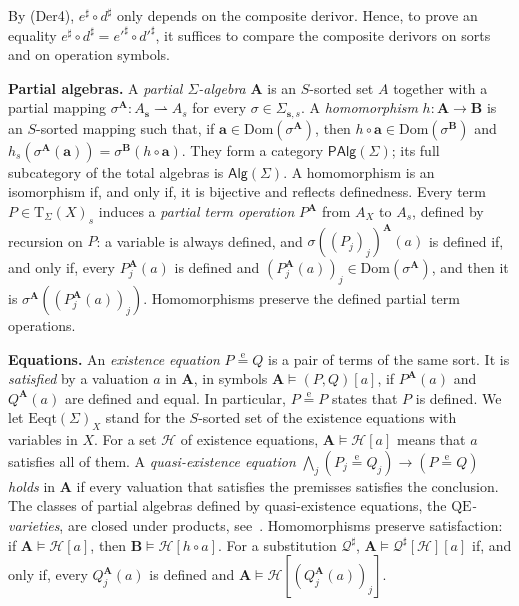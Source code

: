 \documentclass[a4paper,reqno]{amsart}
\newcommand{\eeq}{\overset{\mathrm e}{=}}        %
\newcommand{\QE}{\mathrm{QE}}
\newcommand{\Dom}{\mathrm{Dom}}
\newcommand{\Eeqt}{\mathrm{Eeqt}}
\newcommand{\PAlg}{\mathsf{PAlg}}
\newcommand{\mor}{\to}
\newcommand{\dmor}{\rightharpoonup}
\newcommand{\T}{\mathrm{T}}
\theoremstyle{plain}
\theoremstyle{definition}
\begin{document}
By (Der4), $e^{\sharp}\circ d^{\sharp}$ only depends on the composite derivor.
Hence, to prove an equality $e^{\sharp}\circ d^{\sharp}=e'^{\sharp}\circ d'^{\sharp}$, it suffices to compare the composite derivors on sorts and on operation symbols.

\textbf{Partial algebras.}
A \emph{partial $\Sigma$-algebra} $\mathbf{A}$ is an $S$-sorted set $A$ together with a partial mapping $\sigma^{\mathbf{A}}\colon A_{\mathbf{s}}\dmor A_{s}$ for every $\sigma\in\Sigma_{\mathbf{s},s}$.
A \emph{homomorphism} $h\colon\mathbf{A}\mor\mathbf{B}$ is an $S$-sorted mapping such that, if $\mathbf{a}\in\Dom(\sigma^{\mathbf{A}})$, then $h\circ\mathbf{a}\in\Dom(\sigma^{\mathbf{B}})$ and $h_{s}(\sigma^{\mathbf{A}}(\mathbf{a}))=\sigma^{\mathbf{B}}(h\circ\mathbf{a})$.
They form a category $\PAlg(\Sigma)$; its full subcategory of the total algebras is $\mathsf{Alg}(\Sigma)$.
A homomorphism is an isomorphism if, and only if, it is bijective and reflects definedness.
Every term $P\in\T_{\Sigma}(X)_{s}$ induces a \emph{partial term operation} $P^{\mathbf{A}}$ from $A_{X}$ to $A_{s}$, defined by recursion on $P$: a variable is always defined, and $\sigma((P_{j})_{j})^{\mathbf{A}}(a)$ is defined if, and only if, every $P_{j}^{\mathbf{A}}(a)$ is defined and $(P_{j}^{\mathbf{A}}(a))_{j}\in\Dom(\sigma^{\mathbf{A}})$, and then it is $\sigma^{\mathbf{A}}((P_{j}^{\mathbf{A}}(a))_{j})$.
Homomorphisms preserve the defined partial term operations.

\textbf{Equations.}
An \emph{existence equation} $P\eeq Q$ is a pair of terms of the same sort.
It is \emph{satisfied} by a valuation $a$ in $\mathbf{A}$, in symbols $\mathbf{A}\models(P,Q)[a]$, if $P^{\mathbf{A}}(a)$ and $Q^{\mathbf{A}}(a)$ are defined and equal.
In particular, $P\eeq P$ states that $P$ is defined.
We let $\Eeqt(\Sigma)_{X}$ stand for the $S$-sorted set of the existence equations with variables in $X$.
For a set $\mathcal{H}$ of existence equations, $\mathbf{A}\models\mathcal{H}[a]$ means that $a$ satisfies all of them.
A \emph{quasi-existence equation} $\bigwedge_{j}(P_{j}\eeq Q_{j})\to(P\eeq Q)$ \emph{holds} in $\mathbf{A}$ if every valuation that satisfies the premisses satisfies the conclusion.
The classes of partial algebras defined by quasi-existence equations, the \emph{$\QE$-varieties}, are closed under products, see~\cite{pb86}.
Homomorphisms preserve satisfaction: if $\mathbf{A}\models\mathcal{H}[a]$, then $\mathbf{B}\models\mathcal{H}[h\circ a]$.
For a substitution $\mathcal{Q}^{\sharp}$, $\mathbf{A}\models\mathcal{Q}^{\sharp}[\mathcal{H}][a]$ if, and only if, every $Q_{j}^{\mathbf{A}}(a)$ is defined and $\mathbf{A}\models\mathcal{H}[(Q_{j}^{\mathbf{A}}(a))_{j}]$.
\end{document}
